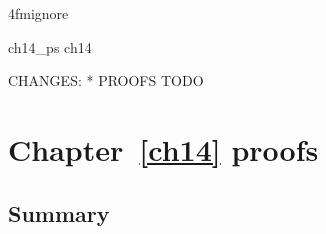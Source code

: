 \ai4fmignore{
\begin{zsection}
  \SECTION ch14\_ps \parents ch14
\end{zsection}
CHANGES:
* PROOFS TODO
}

\chapter{Chapter~\ref{ch14} proofs}





\newpage
\section{Summary}\label{ch14.ps.summary}
\lpscriptsummary
